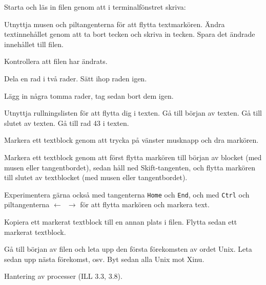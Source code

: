 \begin{Datorarbete}
	\begin{Deluppgifter}
		\item Starta  och läs in filen  genom att i terminalfönstret skriva:\\
		\item Utnyttja musen och piltangenterna för att flytta textmarkören. Ändra textinnehållet genom att ta bort tecken och skriva in tecken. Spara det ändrade innehållet till filen.
		\item Kontrollera att filen  har ändrats.
		\item Dela en rad i två rader. Sätt ihop raden igen.
		\item Lägg in några tomma rader, tag sedan bort dem igen.
		\item Utnyttja rullningslisten för att flytta dig i texten. Gå till början av texten. Gå till slutet av texten. Gå till rad 43 i texten.
		\item Markera ett textblock genom att trycka på vänster musknapp och dra markören.
		\item Markera ett textblock genom att först flytta markören till början av blocket (med musen eller tangentbordet), sedan håll ned Skift-tangenten, och flytta markören till slutet av textblocket (med musen eller tangentbordet).
		\item Experimentera gärna också med tangenterna \texttt{Home} och \texttt{End}, och med \texttt{Ctrl} och piltangenterna \texttt{$\leftarrow$ $\rightarrow$} för att flytta markören och markera text.
		\item Kopiera ett markerat textblock till en annan plats i filen. Flytta sedan ett markerat textblock.
		\item Gå till början av filen och leta upp den första förekomsten av ordet Unix. Leta sedan upp nästa förekomst, osv. Byt sedan alla Unix mot Xinu.
	\end{Deluppgifter}

	\item Hantering av processer (ILL 3.3, 3.8).


\end{Datorarbete}
